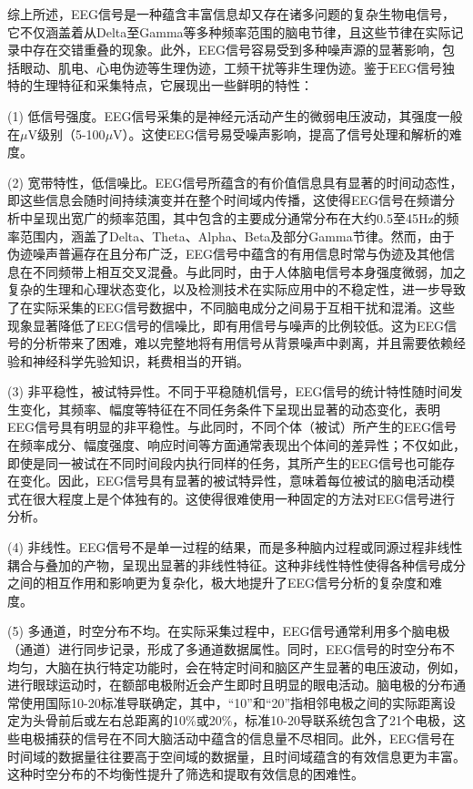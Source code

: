 综上所述，EEG信号是一种蕴含丰富信息却又存在诸多问题的复杂生物电信号，它不仅涵盖着从Delta至Gamma等多种频率范围的脑电节律，且这些节律在实际记录中存在交错重叠的现象。此外，EEG信号容易受到多种噪声源的显著影响，包括眼动、肌电、心电伪迹等生理伪迹，工频干扰等非生理伪迹。鉴于EEG信号独特的生理特征和采集特点，它展现出一些鲜明的特性：

(1) 低信号强度。EEG信号采集的是神经元活动产生的微弱电压波动，其强度一般在\(\mu\)V级别（5-100\(\mu\)V）\cite{SJCJ201505001}。这使EEG信号易受噪声影响，提高了信号处理和解析的难度。

(2) 宽带特性，低信噪比。EEG信号所蕴含的有价值信息具有显著的时间动态性，即这些信息会随时间持续演变并在整个时间域内传播，这使得EEG信号在频谱分析中呈现出宽广的频率范围，其中包含的主要成分通常分布在大约0.5至45Hz的频率范围内\cite{1022779250.nh}，涵盖了Delta、Theta、Alpha、Beta及部分Gamma节律。然而，由于伪迹噪声普遍存在且分布广泛，EEG信号中蕴含的有用信息时常与伪迹及其他信息在不同频带上相互交叉混叠。与此同时，由于人体脑电信号本身强度微弱，加之复杂的生理和心理状态变化，以及检测技术在实际应用中的不稳定性，进一步导致了在实际采集的EEG信号数据中，不同脑电成分之间易于互相干扰和混淆。这些现象显著降低了EEG信号的信噪比，即有用信号与噪声的比例较低。这为EEG信号的分析带来了困难，难以完整地将有用信号从背景噪声中剥离，并且需要依赖经验和神经科学先验知识，耗费相当的开销。

(3) 非平稳性，被试特异性。不同于平稳随机信号，EEG信号的统计特性随时间发生变化，其频率、幅度等特征在不同任务条件下呈现出显著的动态变化，表明EEG信号具有明显的非平稳性。与此同时，不同个体（被试）所产生的EEG信号在频率成分、幅度强度、响应时间等方面通常表现出个体间的差异性；不仅如此，即使是同一被试在不同时间段内执行同样的任务，其所产生的EEG信号也可能存在变化。因此，EEG信号具有显著的被试特异性，意味着每位被试的脑电活动模式在很大程度上是个体独有的。这使得很难使用一种固定的方法对EEG信号进行分析。

(4) 非线性。EEG信号不是单一过程的结果，而是多种脑内过程或同源过程非线性耦合与叠加的产物，呈现出显著的非线性特征。这种非线性特性使得各种信号成分之间的相互作用和影响更为复杂化，极大地提升了EEG信号分析的复杂度和难度。

(5) 多通道，时空分布不均。在实际采集过程中，EEG信号通常利用多个脑电极（通道）进行同步记录，形成了多通道数据属性。同时，EEG信号的时空分布不均匀，大脑在执行特定功能时，会在特定时间和脑区产生显著的电压波动，例如，进行眼球运动时，在额部电极附近会产生即时且明显的眼电活动。脑电极的分布通常使用国际10-20标准导联确定，其中，“10”和“20”指相邻电极之间的实际距离设定为头骨前后或左右总距离的10\%或20\%\cite{jasper1958ten}，标准10-20导联系统包含了21个电极，这些电极捕获的信号在不同大脑活动中蕴含的信息量不尽相同。此外，EEG信号在时间域的数据量往往要高于空间域的数据量，且时间域蕴含的有效信息更为丰富。这种时空分布的不均衡性提升了筛选和提取有效信息的困难性。

